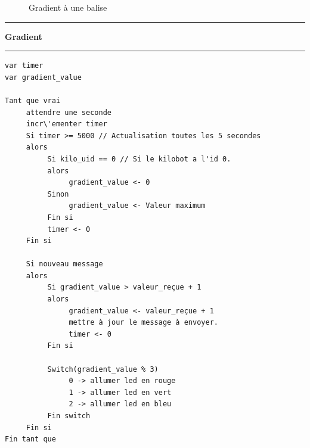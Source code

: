 \documentclass[a4paper,8pt]{report}
\begin{document}
\medskip
\begin{figure}[!h]
    \centering
    \caption{Gradient à une balise}
\end{figure}

\newpage
\begin{center}
  \rule{\linewidth}{.5pt}
  \textbf{Gradient}\\
  \rule{\linewidth}{.5pt}
\end{center}

\begin{verbatim}
var timer
var gradient_value

Tant que vrai
     attendre une seconde
     incr\'ementer timer
     Si timer >= 5000 // Actualisation toutes les 5 secondes
     alors
          Si kilo_uid == 0 // Si le kilobot a l'id 0.
          alors
               gradient_value <- 0
          Sinon
               gradient_value <- Valeur maximum
          Fin si
          timer <- 0
     Fin si

     Si nouveau message
     alors
          Si gradient_value > valeur_reçue + 1
          alors
               gradient_value <- valeur_reçue + 1
               mettre à jour le message à envoyer.
               timer <- 0
          Fin si

          Switch(gradient_value % 3)
               0 -> allumer led en rouge
               1 -> allumer led en vert
               2 -> allumer led en bleu
          Fin switch
     Fin si
Fin tant que
\end{verbatim}

\end{document}
